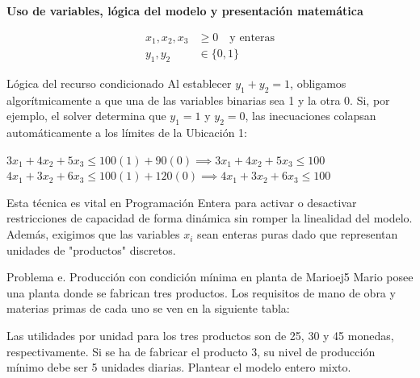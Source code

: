 \documentclass[10pt,a4paper]{article}
\begin{document}
\vspace{3mm}

\textbf{Uso de variables, lógica del modelo y presentación matemática}

\begin{align*}
    x_1, x_2, x_3 &\ge 0 \quad \text{y enteras} \\
    y_1, y_2 &\in \{0, 1\}
\end{align*}

\begin{nota}{Lógica del recurso condicionado}
Al establecer $y_1 + y_2 = 1$, obligamos algorítmicamente a que una de las variables binarias sea 1 y la otra 0. Si, por ejemplo, el solver determina que $y_1 = 1$ y $y_2 = 0$, las inecuaciones colapsan automáticamente a los límites de la Ubicación 1:
\begin{center}
$3x_1 + 4x_2 + 5x_3 \le 100(1) + 90(0) \implies 3x_1 + 4x_2 + 5x_3 \le 100$ \\
$4x_1 + 3x_2 + 6x_3 \le 100(1) + 120(0) \implies 4x_1 + 3x_2 + 6x_3 \le 100$
\end{center}
Esta técnica es vital en Programación Entera para activar o desactivar restricciones de capacidad de forma dinámica sin romper la linealidad del modelo. Además, exigimos que las variables $x_i$ sean enteras puras dado que representan unidades de "productos" discretos.
\end{nota}

\newpage

\begin{ejercicio}{Problema e. Producción con condición mínima en planta de Mario}{ej5}
Mario posee una planta donde se fabrican tres productos. Los requisitos de mano de obra y materias primas de cada uno se ven en la siguiente tabla:

\begin{center}
\end{center}

Las utilidades por unidad para los tres productos son de 25, 30 y 45 monedas, respectivamente. Si se ha de fabricar el producto 3, su nivel de producción mínimo debe ser 5 unidades diarias. Plantear el modelo entero mixto.
\end{ejercicio}
\end{document}
